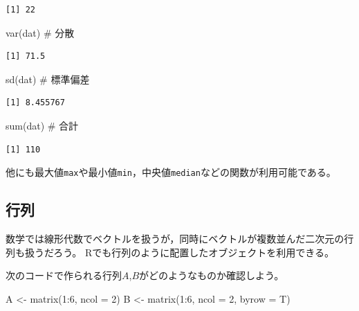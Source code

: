 \documentclass[
  a4paper,
]{ltjsbook}
\newenvironment{Shaded}{\begin{snugshade}}{\end{snugshade}}
\newcommand{\AttributeTok}[1]{\textcolor[rgb]{0.40,0.45,0.13}{#1}}
\newcommand{\CommentTok}[1]{\textcolor[rgb]{0.37,0.37,0.37}{#1}}
\newcommand{\DecValTok}[1]{\textcolor[rgb]{0.68,0.00,0.00}{#1}}
\newcommand{\FunctionTok}[1]{\textcolor[rgb]{0.28,0.35,0.67}{#1}}
\newcommand{\NormalTok}[1]{\textcolor[rgb]{0.00,0.23,0.31}{#1}}
\newcommand{\OtherTok}[1]{\textcolor[rgb]{0.00,0.23,0.31}{#1}}
\newcommand{\SpecialCharTok}[1]{\textcolor[rgb]{0.37,0.37,0.37}{#1}}
\begin{document}
\begin{verbatim}
[1] 22
\end{verbatim}

\begin{Shaded}
\begin{Highlighting}[]
\FunctionTok{var}\NormalTok{(dat) }\CommentTok{\# 分散}
\end{Highlighting}
\end{Shaded}

\begin{verbatim}
[1] 71.5
\end{verbatim}

\begin{Shaded}
\begin{Highlighting}[]
\FunctionTok{sd}\NormalTok{(dat) }\CommentTok{\# 標準偏差}
\end{Highlighting}
\end{Shaded}

\begin{verbatim}
[1] 8.455767
\end{verbatim}

\begin{Shaded}
\begin{Highlighting}[]
\FunctionTok{sum}\NormalTok{(dat) }\CommentTok{\# 合計}
\end{Highlighting}
\end{Shaded}

\begin{verbatim}
[1] 110
\end{verbatim}

他にも最大値\texttt{max}や最小値\texttt{min}，中央値\texttt{median}などの関数が利用可能である。

\subsection{行列}\label{ux884cux5217}

数学では線形代数でベクトルを扱うが，同時にベクトルが複数並んだ二次元の行列も扱うだろう。
Rでも行列のように配置したオブジェクトを利用できる。

次のコードで作られる行列\(A\),\(B\)がどのようなものか確認しよう。

\begin{Shaded}
\begin{Highlighting}[]
\NormalTok{A }\OtherTok{\textless{}{-}} \FunctionTok{matrix}\NormalTok{(}\DecValTok{1}\SpecialCharTok{:}\DecValTok{6}\NormalTok{, }\AttributeTok{ncol =} \DecValTok{2}\NormalTok{)}
\NormalTok{B }\OtherTok{\textless{}{-}} \FunctionTok{matrix}\NormalTok{(}\DecValTok{1}\SpecialCharTok{:}\DecValTok{6}\NormalTok{, }\AttributeTok{ncol =} \DecValTok{2}\NormalTok{, }\AttributeTok{byrow =}\NormalTok{ T)}
\end{Highlighting}
\end{Shaded}
\end{document}
